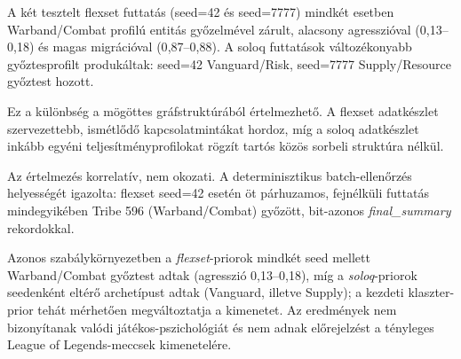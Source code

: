 A két tesztelt flexset futtatás (seed=42 és seed=7777) mindkét esetben Warband/Combat profilú entitás győzelmével zárult, alacsony agresszióval (0{,}13–0{,}18) és magas migrációval (0{,}87–0{,}88). A soloq futtatások változékonyabb győztesprofilt produkáltak: seed=42 Vanguard/Risk, seed=7777 Supply/Resource győztest hozott.

Ez a különbség a mögöttes gráfstruktúrából értelmezhető. A flexset adatkészlet szervezettebb, ismétlődő kapcsolatmintákat hordoz, míg a soloq adatkészlet inkább egyéni teljesítményprofilokat rögzít tartós közös sorbeli struktúra nélkül.

Az értelmezés korrelatív, nem okozati. A determinisztikus batch-ellenőrzés helyességét igazolta: flexset seed=42 esetén öt párhuzamos, fejnélküli futtatás mindegyikében Tribe 596 (Warband/Combat) győzött, bit-azonos \textit{final\_summary} rekordokkal.

Azonos szabálykörnyezetben a \textit{flexset}-priorok mindkét seed mellett Warband/Combat győztest adtak (agresszió 0{,}13–0{,}18), míg a \textit{soloq}-priorok seedenként eltérő archetípust adtak (Vanguard, illetve Supply); a kezdeti klaszter-prior tehát mérhetően megváltoztatja a kimenetet. Az eredmények nem bizonyítanak valódi játékos-pszichológiát és nem adnak előrejelzést a tényleges League of Legends-meccsek kimenetelére.

